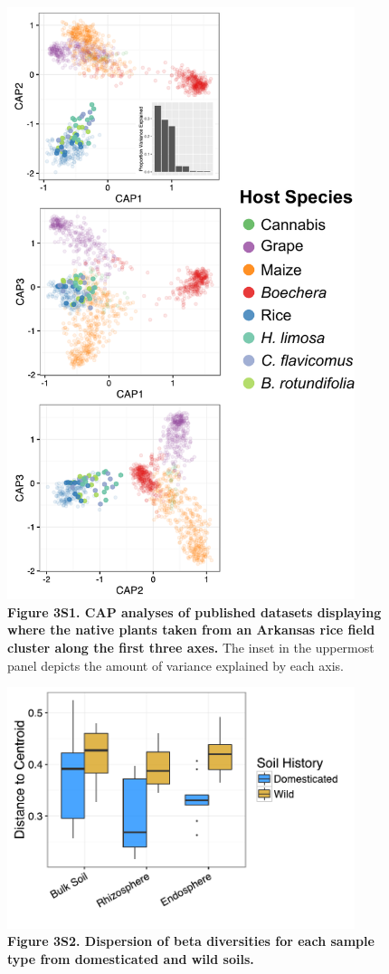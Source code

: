 \newpage

\begin{figure}[h]
\centering
\includegraphics[width=4in]{Figures/figure2_s1}
\captionsetup{labelformat=empty}
\caption[Figure 3S1]{\textbf{Figure 3S1. CAP analyses of published datasets displaying where the native plants taken from an Arkansas rice field cluster along the first three axes.} The inset in the uppermost panel depicts the amount of variance explained by each axis.}
\label{Figure 3S1}
\end{figure}

\newpage

\begin{figure}[h]
\centering
\includegraphics[width=4in]{Figures/figure2_s2}
\captionsetup{labelformat=empty}
\caption[Figure 3S2]{\textbf{Figure 3S2. Dispersion of beta diversities for each sample type from domesticated and wild soils.}}
\label{Figure 3S2}
\end{figure}